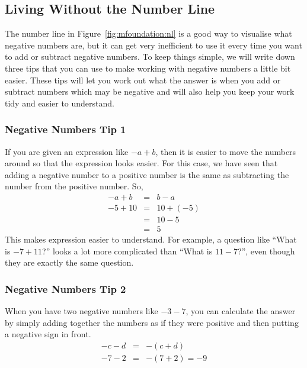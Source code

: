 \documentclass[10pt,a4paper,titlepage,twoside,openright]{report}
\begin{document}
\subsection{Living Without the Number Line}
The number line in Figure~\ref{fig:mfoundation:nl} is a good way to visualise
what negative numbers are, but it can get very inefficient to use it every time
you want to add or subtract negative numbers. To keep things simple, we will
write down three tips that you can use to make working with negative numbers a
little bit easier. These tips will let you work out what the answer is when you
add or subtract numbers which may be negative and will also help you keep your
work tidy and easier to understand.


\subsubsection{Negative Numbers Tip 1}
If you are given an expression like $-a+b$, then it is easier to move the numbers
around so that the expression looks easier. For this case, we have seen that
adding a negative number to a positive number is the same as subtracting the
number from the positive number. So,
\begin{eqnarray}
  \label{eq:mfoundation:alg:rule1}
  -a+b &=& b-a \\ \nonumber
  -5 + 10 &=& 10 + (- 5) \\ \nonumber
          &=& 10 - 5 \\ \nonumber
          &=& 5
\end{eqnarray}
This makes expression easier to understand. For example, a question like ``What
is $-7+11$?'' looks a lot more complicated than ``What is $11-7$?'', even though
they are exactly the same question.

\subsubsection{Negative Numbers Tip 2}
When you have two negative numbers like $-3-7$, you can calculate the answer by
simply adding together the numbers as if they were positive and then putting a
negative sign in front.
\begin{eqnarray}
  \label{eq:mfoundation:alg:rule2}
  -c-d &=& -(c+d)\\ \nonumber
  -7 - 2 &=& -(7+2) = -9
\end{eqnarray}
\end{document}

